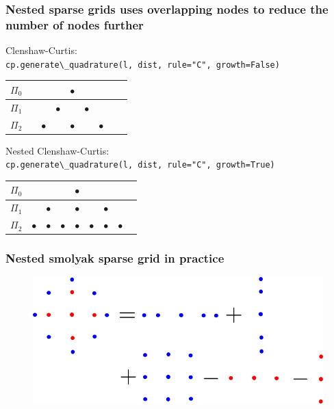 \documentclass{beamer}
\begin{document}
 \begin{frame}
  \frametitle{Nested sparse grids uses overlapping nodes to reduce
  the number of nodes further}
  
  \begin{alert}
      {Clenshaw-Curtis:}\\
      \scriptsize
     \verb;cp.generate\_quadrature(l, dist, rule="C", growth=False);
    \normalsize
  \begin{table}
  \begin{tabular}{lcccccccc}
    $\Pi_0$& &&& $\bullet$& &&&  \\\hline
   $\Pi_1$ &&&$\bullet$& &$\bullet$&&& \\\hline
   $\Pi_2$ &&$\bullet$&&$\bullet$ &&$\bullet$&& \\
   \end{tabular}
  \end{table}
  \end{alert}
  \pause
  \begin{alert}
      {Nested Clenshaw-Curtis:}\\
      \scriptsize
    \verb;cp.generate\_quadrature(l, dist, rule="C", growth=True);
    \normalsize
  \begin{table}
  \begin{tabular}{lcccccccc}
    $\Pi_0$& &&& $\bullet$& &&&  \\\hline
   $\Pi_1$ &&$\bullet$&& $\bullet$&&$\bullet$ && \\\hline
   $\Pi_2$ &$\bullet$&$\bullet$&$\bullet$& $\bullet$&$\bullet$&$\bullet$ &$\bullet$& \\
   \end{tabular}
  \end{table}
  \end{alert}
 
  \end{frame}

\begin{frame}
 \frametitle{Nested smolyak sparse grid in practice}


 \begin{figure}
  \includegraphics[width=\textwidth]{smolyak_nested.png}
 \end{figure}

\end{frame}
\end{document}
